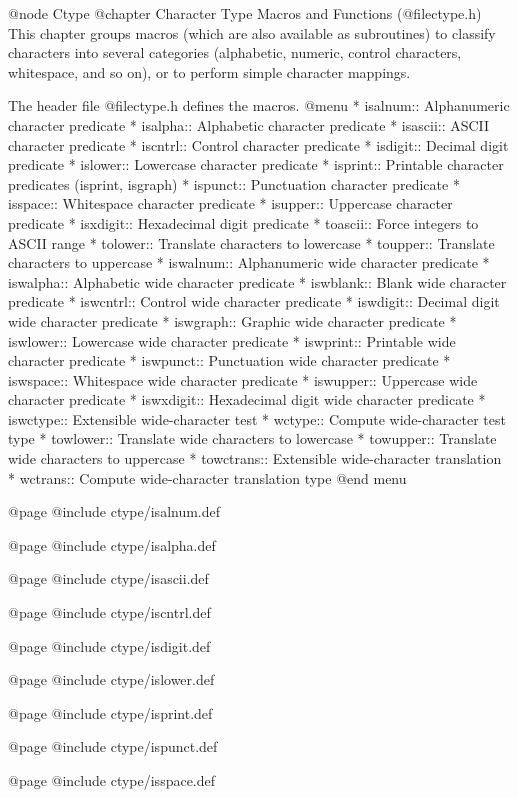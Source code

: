 @node Ctype
@chapter Character Type Macros and Functions (@file{ctype.h})
This chapter groups macros (which are also available as subroutines)
to classify characters into several categories (alphabetic,
numeric, control characters, whitespace, and so on), or to perform
simple character mappings.

The header file @file{ctype.h} defines the macros.
@menu
* isalnum::   Alphanumeric character predicate
* isalpha::   Alphabetic character predicate
* isascii::   ASCII character predicate
* iscntrl::   Control character predicate
* isdigit::   Decimal digit predicate
* islower::   Lowercase character predicate
* isprint::   Printable character predicates (isprint, isgraph)
* ispunct::   Punctuation character predicate
* isspace::   Whitespace character predicate
* isupper::   Uppercase character predicate
* isxdigit::  Hexadecimal digit predicate
* toascii::   Force integers to ASCII range
* tolower::   Translate characters to lowercase
* toupper::   Translate characters to uppercase
* iswalnum::  Alphanumeric wide character predicate
* iswalpha::  Alphabetic wide character predicate
* iswblank::  Blank wide character predicate
* iswcntrl::  Control wide character predicate
* iswdigit::  Decimal digit wide character predicate
* iswgraph::  Graphic wide character predicate
* iswlower::  Lowercase wide character predicate
* iswprint::  Printable wide character predicate
* iswpunct::  Punctuation wide character predicate
* iswspace::  Whitespace wide character predicate
* iswupper::  Uppercase wide character predicate
* iswxdigit:: Hexadecimal digit wide character predicate
* iswctype::  Extensible wide-character test
* wctype::    Compute wide-character test type
* towlower::  Translate wide characters to lowercase
* towupper::  Translate wide characters to uppercase
* towctrans:: Extensible wide-character translation
* wctrans::   Compute wide-character translation type
@end menu

@page
@include ctype/isalnum.def

@page
@include ctype/isalpha.def

@page
@include ctype/isascii.def

@page
@include ctype/iscntrl.def

@page
@include ctype/isdigit.def

@page
@include ctype/islower.def

@page
@include ctype/isprint.def

@page
@include ctype/ispunct.def

@page
@include ctype/isspace.def

